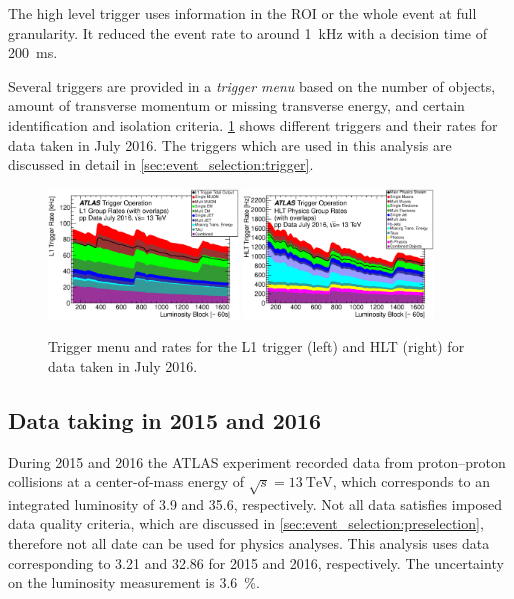 The high level trigger uses information in the ROI or the whole event at full granularity.
It reduced the event rate to around \SI{1}{\kHz} with a decision time of \SI{200}{\ms}.

Several triggers are provided in a \emph{trigger menu} based on the number of objects,
amount of transverse momentum or missing transverse energy, and certain identification and
isolation criteria.
\cref{fig:setup:triggermenu} shows different triggers and their rates for data taken in July 2016.
The triggers which are used in this analysis are discussed in detail in \cref{sec:event_selection:trigger}.

\begin{figure}[htb]
    \centering
    \includegraphics[width=0.45\textwidth]{./figures/setup/l1_trigger_menu_2016.eps}
    \includegraphics[width=0.45\textwidth]{./figures/setup/hlt_trigger_menu_2016.eps}
    \caption{Trigger menu and rates for the L1 trigger (left) and HLT (right) for data taken in July 2016.~\cite{TriggerMenu2016}}\label{fig:setup:triggermenu}
\end{figure}


\subsection{Data taking in 2015 and 2016}\label{sec:setup:data}

During 2015 and 2016 the ATLAS experiment recorded data from proton--proton collisions at a center-of-mass energy
of $\sqrt{s} = \SI{13}{\TeV}$, which corresponds to an integrated luminosity of \SI{3.9}{\invfb} and \SI{35.6}{\invfb}, respectively.
Not all data satisfies imposed data quality criteria, which are discussed in \cref{sec:event_selection:preselection},
therefore not all date can be used for physics analyses.
This analysis uses data corresponding to \SI{3.21}{\invfb} and \SI{32.86}{\invfb} for 2015 and 2016, respectively.
The uncertainty on the luminosity measurement is \SI{3.6}{\percent}.

